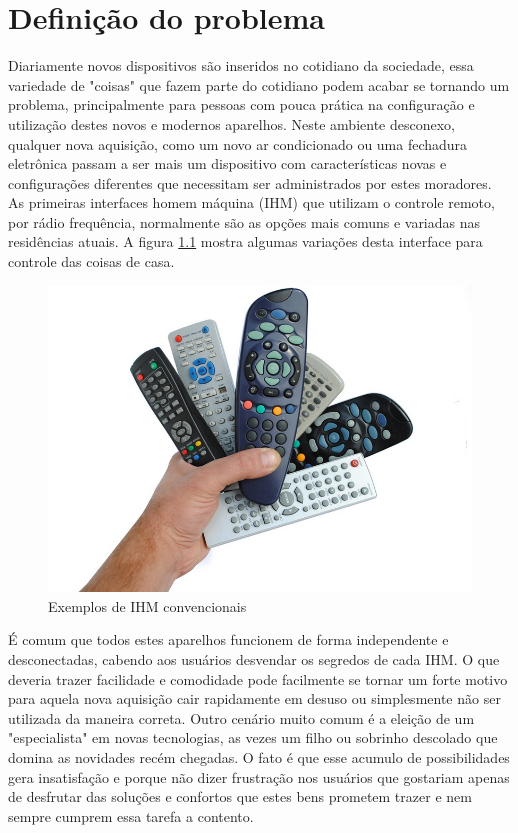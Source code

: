 \chapter{Definição do problema}

Diariamente novos dispositivos são inseridos no cotidiano da sociedade, essa variedade de "coisas" que fazem parte do cotidiano podem acabar se tornando um problema, principalmente para pessoas com pouca prática na configuração e utilização destes novos e modernos aparelhos. Neste ambiente desconexo, qualquer nova aquisição, como um novo ar condicionado ou uma fechadura eletrônica passam a ser mais um dispositivo com características novas e configurações diferentes que necessitam ser administrados por estes moradores.
As primeiras interfaces homem máquina (IHM) que utilizam o controle remoto, por rádio frequência, normalmente são as opções mais comuns e variadas nas residências atuais. A figura \ref{controle} mostra algumas variações desta interface para controle das coisas de casa.

\begin{figure}[H]
\caption{\label{controle} Exemplos de IHM convencionais}
\includegraphics[scale=0.35]{img/controle-remoto.png}
\end{figure}

É comum que todos estes aparelhos funcionem de forma independente e desconectadas, cabendo aos usuários desvendar os segredos de cada IHM. O que deveria trazer facilidade e comodidade pode facilmente se tornar um forte motivo para aquela nova aquisição cair rapidamente em desuso ou simplesmente não ser utilizada da maneira correta. Outro cenário muito comum é a eleição de um "especialista" em novas tecnologias, as vezes um filho ou sobrinho descolado que domina as novidades recém chegadas. O fato é que esse acumulo de possibilidades gera insatisfação e porque não dizer frustração nos usuários que gostariam apenas de desfrutar das soluções e confortos que estes bens prometem trazer e nem sempre cumprem essa tarefa a contento.

